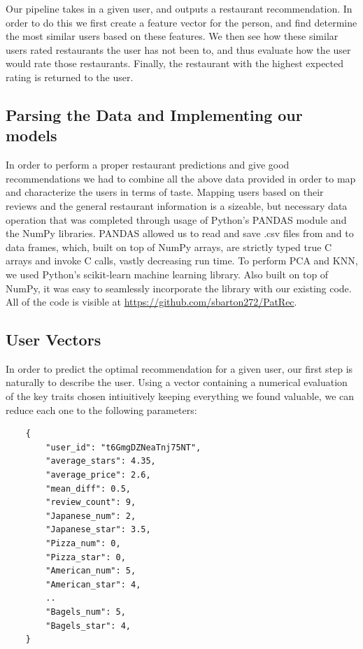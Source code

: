 \documentclass[10pt,twocolumn,letterpaper]{article}
\begin{document}
Our pipeline takes in a given user, and outputs a restaurant recommendation. In order to do this we first create a feature vector for the person, and find determine the most similar users based on these features. We then see how these similar users rated restaurants the user has not been to, and thus evaluate how the user would rate those restaurants. Finally, the restaurant with the highest expected rating is returned to the user.

\subsection{Parsing the Data and Implementing our models}
In order to perform a proper restaurant predictions and give good recommendations we had to combine all the above data provided in order to map and characterize the users in terms of taste. Mapping users based on their reviews and the general restaurant information is a sizeable, but necessary data operation that was completed through usage of Python's PANDAS module and the NumPy libraries. PANDAS allowed us to read and save .csv files from and to data frames, which, built on top of NumPy arrays, are strictly typed true C arrays and invoke C calls, vastly decreasing run time. To perform PCA and KNN, we used Python's scikit-learn machine learning library. Also built on top of NumPy, it was easy to seamlessly incorporate the library with our existing code. All of the code is visible at \url{https://github.com/sbarton272/PatRec}.

\subsection{User Vectors}
In order to predict the optimal recommendation for a given user, our first step is naturally to describe the user. Using a vector containing a numerical evaluation of the key traits chosen intiuitively keeping everything we found valuable, we can reduce each one to the following parameters:
\begin{verbatim}
	{
	    "user_id": "t6GmgDZNeaTnj75NT",
	    "average_stars": 4.35,
	    "average_price": 2.6,
	   	"mean_diff": 0.5,
	   	"review_count": 9,
	   	"Japanese_num": 2,
	   	"Japanese_star": 3.5,
	   	"Pizza_num": 0,
	   	"Pizza_star": 0,
	   	"American_num": 5,
	   	"American_star": 4,
	   	..
	   	"Bagels_num": 5,
	   	"Bagels_star": 4,
	}
\end{verbatim}
\end{document}
